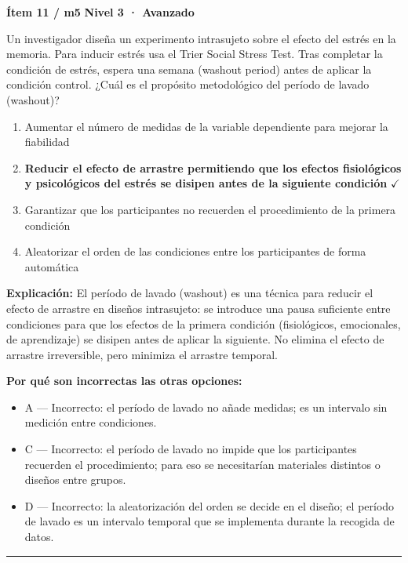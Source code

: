 \documentclass[12pt,a4paper]{article}
\begin{document}
\begin{mdframed}[backgroundcolor=fondogris,linecolor=rojo,linewidth=1pt,innerleftmargin=10pt,innerrightmargin=10pt,innertopmargin=7pt,innerbottommargin=7pt]
\textbf{Ítem 11 / m5} \hfill {\small\bfseries\color{rojo} Nivel 3 · Avanzado}
\end{mdframed}

Un investigador diseña un experimento intrasujeto sobre el efecto del estrés en la memoria. Para inducir estrés usa el Trier Social Stress Test. Tras completar la condición de estrés, espera una semana (washout period) antes de aplicar la condición control. ¿Cuál es el propósito metodológico del período de lavado (washout)?

\begin{enumerate}
  \item[A.] Aumentar el número de medidas de la variable dependiente para mejorar la fiabilidad
  \item[\textbf{\color{verde}B.}] \textbf{\color{verde} Reducir el efecto de arrastre permitiendo que los efectos fisiológicos y psicológicos del estrés se disipen antes de la siguiente condición} \hfill $\checkmark$
  \item[C.] Garantizar que los participantes no recuerden el procedimiento de la primera condición
  \item[D.] Aleatorizar el orden de las condiciones entre los participantes de forma automática
\end{enumerate}

\noindent\textbf{\color{azul}Explicación:} El período de lavado (washout) es una técnica para reducir el efecto de arrastre en diseños intrasujeto: se introduce una pausa suficiente entre condiciones para que los efectos de la primera condición (fisiológicos, emocionales, de aprendizaje) se disipen antes de aplicar la siguiente. No elimina el efecto de arrastre irreversible, pero minimiza el arrastre temporal.

\noindent\textbf{\color{gris}Por qué son incorrectas las otras opciones:}
\begin{itemize}
  \item {\small A — Incorrecto: el período de lavado no añade medidas; es un intervalo sin medición entre condiciones.}
  \item {\small C — Incorrecto: el período de lavado no impide que los participantes recuerden el procedimiento; para eso se necesitarían materiales distintos o diseños entre grupos.}
  \item {\small D — Incorrecto: la aleatorización del orden se decide en el diseño; el período de lavado es un intervalo temporal que se implementa durante la recogida de datos.}
\end{itemize}
\vspace{8pt}\hrule\vspace{10pt}
\end{document}

